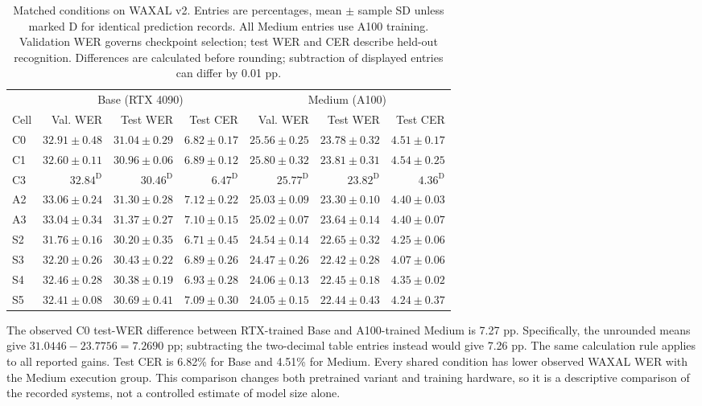\documentclass[12pt,a4paper]{report}
\begin{document}
\begin{table}[htbp]\centering\scriptsize
\caption{Matched conditions on WAXAL v2. Entries are percentages, mean $\pm$
sample SD unless marked D for identical prediction records. All Medium
entries use A100 training. Validation WER governs checkpoint selection;
test WER and CER describe held-out recognition. Differences are calculated
before rounding; subtraction of displayed entries can differ by 0.01 pp.}
\label{tab:waxal}
\setlength{\tabcolsep}{3pt}
\begin{tabular}{lrrrrrr}\toprule
 & \multicolumn{3}{c}{Base (RTX 4090)} & \multicolumn{3}{c}{Medium (A100)}\\
Cell & Val. WER & Test WER & Test CER & Val. WER & Test WER & Test CER\\\midrule
C0 & $32.91 \pm 0.48$ & $31.04 \pm 0.29$ & $6.82 \pm 0.17$ & $25.56 \pm 0.25$ & $23.78 \pm 0.32$ & $4.51 \pm 0.17$ \\
C1 & $32.60 \pm 0.11$ & $30.96 \pm 0.06$ & $6.89 \pm 0.12$ & $25.80 \pm 0.32$ & $23.81 \pm 0.31$ & $4.54 \pm 0.25$ \\
C3 & $32.84^{\mathrm{D}}$ & $30.46^{\mathrm{D}}$ & $6.47^{\mathrm{D}}$ & $25.77^{\mathrm{D}}$ & $23.82^{\mathrm{D}}$ & $4.36^{\mathrm{D}}$ \\
A2 & $33.06 \pm 0.24$ & $31.30 \pm 0.28$ & $7.12 \pm 0.22$ & $25.03 \pm 0.09$ & $23.30 \pm 0.10$ & $4.40 \pm 0.03$ \\
A3 & $33.04 \pm 0.34$ & $31.37 \pm 0.27$ & $7.10 \pm 0.15$ & $25.02 \pm 0.07$ & $23.64 \pm 0.14$ & $4.40 \pm 0.07$ \\
S2 & $31.76 \pm 0.16$ & $30.20 \pm 0.35$ & $6.71 \pm 0.45$ & $24.54 \pm 0.14$ & $22.65 \pm 0.32$ & $4.25 \pm 0.06$ \\
S3 & $32.20 \pm 0.26$ & $30.43 \pm 0.22$ & $6.89 \pm 0.26$ & $24.47 \pm 0.26$ & $22.42 \pm 0.28$ & $4.07 \pm 0.06$ \\
S4 & $32.46 \pm 0.28$ & $30.38 \pm 0.19$ & $6.93 \pm 0.28$ & $24.06 \pm 0.13$ & $22.45 \pm 0.18$ & $4.35 \pm 0.02$ \\
S5 & $32.41 \pm 0.08$ & $30.69 \pm 0.41$ & $7.09 \pm 0.30$ & $24.05 \pm 0.15$ & $22.44 \pm 0.43$ & $4.24 \pm 0.37$ \\
\bottomrule\end{tabular}\end{table}

The observed C0 test-WER difference between RTX-trained Base and A100-trained
Medium is 7.27 pp. Specifically, the unrounded means give
$31.0446-23.7756=7.2690$ pp; subtracting the two-decimal table entries instead
would give 7.26 pp. The same calculation rule applies to all reported gains.
Test CER is 6.82\% for Base and 4.51\% for Medium. Every shared condition
has lower observed WAXAL WER with the Medium execution group. This comparison
changes both pretrained variant and training hardware, so it is a descriptive
comparison of the recorded systems, not a controlled estimate of model size alone.
\end{document}
